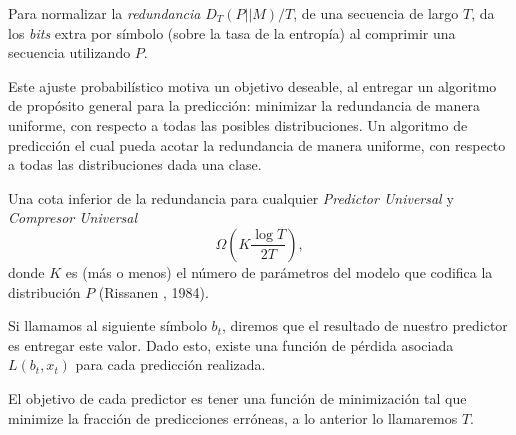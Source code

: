 Para normalizar la \emph{redundancia} $D_{T} ( P || M ) / T $, de una secuencia de largo $T$, da los  \emph{bits} extra por símbolo (sobre la tasa de la entropía) al comprimir una secuencia utilizando $P$.  

Este ajuste probabilístico motiva un objetivo deseable, al entregar un algoritmo de propósito general para la predicción: minimizar la redundancia de manera uniforme, con respecto a todas las posibles distribuciones. Un algoritmo de predicción el cual pueda acotar la redundancia de manera uniforme, con respecto a todas las distribuciones dada una clase.

Una cota inferior de la redundancia para cualquier \emph{Predictor Universal} y \emph{Compresor Universal} \begin{equation}
\Omega \left(  K \dfrac{\log T}{2 T } \right),
\end{equation} donde $K$ es (más o menos) el número de parámetros del modelo que codifica la distribución $P$ (Rissanen \cite{Rissanen1984}, 1984).






 

Si llamamos al siguiente símbolo $b_{t}$, diremos que el resultado de nuestro predictor es entregar este valor. Dado esto, existe una función de pérdida asociada $L( b_{t},x_{t} )$ para cada predicción realizada. 

El objetivo de cada predictor es tener una función de minimización tal que minimize la fracción de predicciones erróneas, a lo anterior lo llamaremos $T$.%




